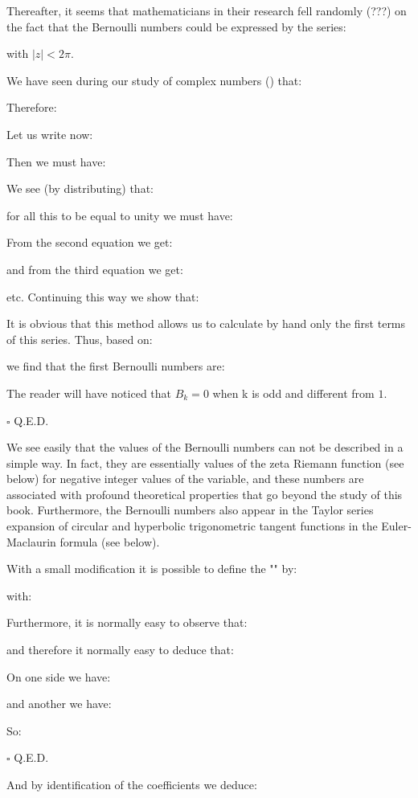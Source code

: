 	\begin{theorem}
	Thereafter, it seems that mathematicians in their research fell randomly (???) on the fact that the Bernoulli numbers could be expressed by the series:
	
	with $\vert z\vert<2\pi$.
	\end{theorem}
	\begin{dem}
	We have seen during our study of complex numbers () that:
		
		Therefore:
		
		Let us write now:
		
		Then we must have:
		
		We see (by distributing) that:
		
		for all this to be equal to unity we must have:
		
		From the second equation we get:
		
		and from the third equation we get:
		
		etc. Continuing this way we show that:
		
		It is obvious that this method allows us to calculate by hand only the first terms of this series.
		Thus, based on:
		
		we find that the first Bernoulli numbers are:
			
		The reader will have noticed that $B_k=0$ when k is odd and different from $1$.
		\begin{flushright}
			$\square$  Q.E.D.
		\end{flushright}
	\end{dem}
	We see easily that the values of the Bernoulli numbers can not be described in a simple way. In fact, they are essentially values of the zeta Riemann function (see below) for negative integer values of the variable, and these numbers are associated with profound theoretical properties that go beyond the study of this book. Furthermore, the Bernoulli numbers also appear in the Taylor series expansion of  circular and hyperbolic trigonometric tangent functions in the Euler-Maclaurin formula (see below).
	
	With a small modification it is possible to define the "" by:
	
	with:
	
	\begin{theorem}
	Furthermore, it is normally easy to observe that:
	
	and therefore it normally easy to deduce that:
	
	\end{theorem}
	\begin{dem}
	On one side we have:
	
	and another we have:
	
	So:
	
	\begin{flushright}
		$\square$  Q.E.D.
	\end{flushright}
	\end{dem}
	And by identification of the coefficients we deduce:
	
